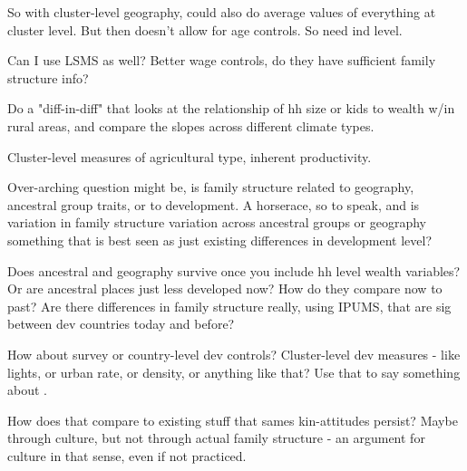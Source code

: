 \documentclass[11pt]{article}
\begin{document}
So with cluster-level geography, could also do average values of everything at cluster level. But then doesn't allow for age controls. So need ind level.

Can I use LSMS as well? Better wage controls, do they have sufficient family structure info? 

Do a "diff-in-diff" that looks at the relationship of hh size or kids to wealth w/in rural areas, and compare the slopes across different climate types. 

Cluster-level measures of agricultural type, inherent productivity. 

Over-arching question might be, is family structure related to geography, ancestral group traits, or to development. A horserace, so to speak, and is variation in family structure variation across ancestral groups or geography something that is best seen as just existing differences in development level? 

Does ancestral and geography survive once you include hh level wealth variables? Or are ancestral places just less developed now? How do they compare now to past? Are there differences in family structure really, using IPUMS, that are sig between dev countries today and before? 

How about survey or country-level dev controls? Cluster-level dev measures - like lights, or urban rate, or density, or anything like that? Use that to say something about . 

How does that compare to existing stuff that sames kin-attitudes persist? Maybe through culture, but not through actual family structure - an argument for culture in that sense, even if not practiced. 
\end{document}
